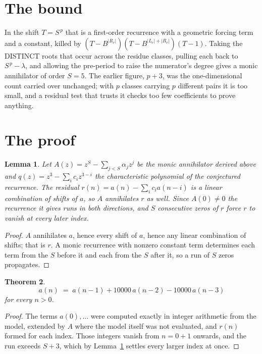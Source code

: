\documentclass[11pt,a4paper]{article}
\theoremstyle{plain}
\newtheorem{theorem}{Theorem}
\newtheorem{lemma}[theorem]{Lemma}
\theoremstyle{definition}
\begin{document}
\section{The bound}

In the shift $T=S^{\,p}$ that is a first-order recurrence with a geometric forcing term and a
constant, killed by $(T-B^{|R_r|})(T-B^{|L_r|+|R_r|})(T-1)$. Taking the DISTINCT roots that
occur across the residue classes, pulling each back to $S^{\,p}-\lambda$, and allowing the
pre-period to raise the numerator's degree gives a monic annihilator of order $S=5$. The
earlier figure, $p+3$, was the one-dimensional count carried over unchanged; with $p$ classes
carrying $p$ different pairs it is too small, and a residual test that trusts it checks too few
coefficients to prove anything.

\section{The proof}

\begin{lemma}\label{lem:crit}
Let $A(z)=z^S-\sum_{j<S}\alpha_jz^{j}$ be the monic annihilator derived above and
$q(z)=z^{3}-\sum_ic_iz^{3-i}$ the characteristic polynomial of the conjectured
recurrence. The residual $r(n)=a(n)-\sum_ic_ia(n-i)$ is a linear combination of shifts of $a$,
so $A$ annihilates $r$ as well. Since $A(0)\ne0$ the recurrence it gives runs in both
directions, and $S$ consecutive zeros of $r$ force $r$ to vanish at every later index.
\end{lemma}

\begin{proof}
$A$ annihilates $a$, hence every shift of $a$, hence any linear combination of shifts; that is
$r$. A monic recurrence with nonzero constant term determines each term from the $S$ before it
and each from the $S$ after it, so a run of $S$ zeros propagates.
\end{proof}

\begin{theorem}
\[
a(n)\;=\;a(n-1) + 10000\,a(n-2) - 10000\,a(n-3)
\]
for every $n>0$.
\end{theorem}

\begin{proof}
The terms $a(0),\dots$ were computed exactly in integer arithmetic from the model, extended by
$A$ where the model itself was not evaluated, and $r(n)$ formed for each index. Those integers
vanish from $n=0+1$ onwards, and the run exceeds $S+3$, which by
Lemma~\ref{lem:crit} settles every larger index at once.
\end{proof}
\end{document}

